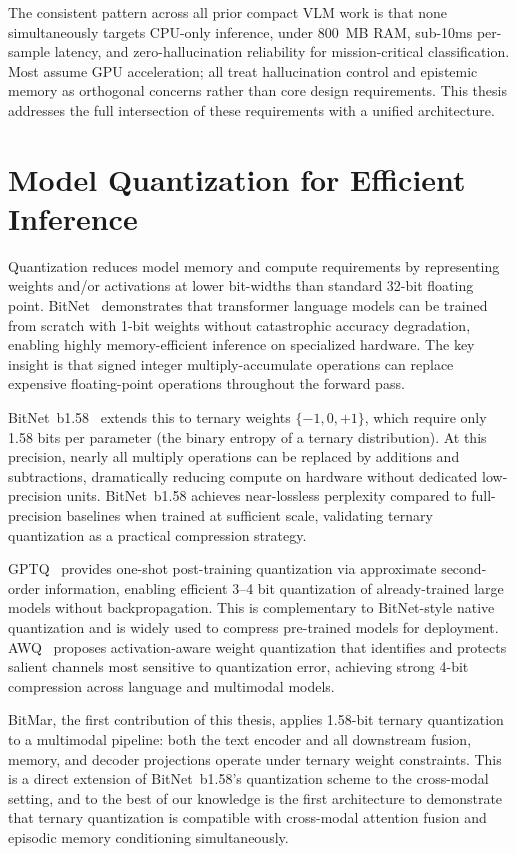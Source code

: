 The consistent pattern across all prior compact VLM work is that none simultaneously targets CPU-only inference, under 800~MB RAM, sub-10ms per-sample latency, and zero-hallucination reliability for mission-critical classification. Most assume GPU acceleration; all treat hallucination control and epistemic memory as orthogonal concerns rather than core design requirements. This thesis addresses the full intersection of these requirements with a unified architecture.

\section{Model Quantization for Efficient Inference}
\label{sec:related_quant}

Quantization reduces model memory and compute requirements by representing weights and/or activations at lower bit-widths than standard 32-bit floating point. BitNet~\cite{wang2023bitnet} demonstrates that transformer language models can be trained from scratch with 1-bit weights without catastrophic accuracy degradation, enabling highly memory-efficient inference on specialized hardware. The key insight is that signed integer multiply-accumulate operations can replace expensive floating-point operations throughout the forward pass.

BitNet~b1.58~\cite{ma2024bitnet158} extends this to ternary weights $\{-1, 0, +1\}$, which require only 1.58 bits per parameter (the binary entropy of a ternary distribution). At this precision, nearly all multiply operations can be replaced by additions and subtractions, dramatically reducing compute on hardware without dedicated low-precision units. BitNet~b1.58 achieves near-lossless perplexity compared to full-precision baselines when trained at sufficient scale, validating ternary quantization as a practical compression strategy.

GPTQ~\cite{frantar2022gptq} provides one-shot post-training quantization via approximate second-order information, enabling efficient 3--4 bit quantization of already-trained large models without backpropagation. This is complementary to BitNet-style native quantization and is widely used to compress pre-trained models for deployment. AWQ~\cite{lin2023awq} proposes activation-aware weight quantization that identifies and protects salient channels most sensitive to quantization error, achieving strong 4-bit compression across language and multimodal models.

BitMar, the first contribution of this thesis, applies 1.58-bit ternary quantization to a multimodal pipeline: both the text encoder and all downstream fusion, memory, and decoder projections operate under ternary weight constraints. This is a direct extension of BitNet~b1.58's quantization scheme to the cross-modal setting, and to the best of our knowledge is the first architecture to demonstrate that ternary quantization is compatible with cross-modal attention fusion and episodic memory conditioning simultaneously.


